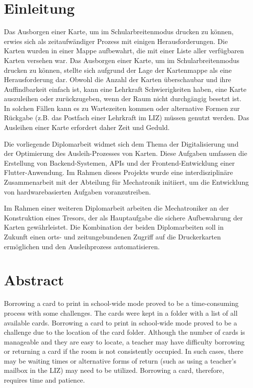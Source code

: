 \section{Einleitung}
Das Ausborgen einer Karte, um im Schularbreitenmodus drucken zu können, erwies sich als zeitaufwändiger Prozess mit einigen Herausforderungen. Die Karten wurden in einer Mappe aufbewahrt, die mit einer Liste aller verfügbaren Karten versehen war. Das Ausborgen einer Karte, um im Schularbreitenmodus drucken zu können, stellte sich aufgrund der Lage der Kartenmappe als eine Herausforderung dar. Obwohl die Anzahl der Karten überschaubar und ihre Auffindbarkeit einfach ist, kann eine Lehrkraft Schwierigkeiten haben, eine Karte auszuleihen oder zurückzugeben, wenn der Raum nicht durchgängig besetzt ist. In solchen Fällen kann es zu Wartezeiten kommen oder alternative Formen zur Rückgabe (z.B. das Postfach einer Lehrkraft im LIZ) müssen genutzt werden. Das Ausleihen einer Karte erfordert daher Zeit und Geduld.\bigskip

\noindent
Die vorliegende Diplomarbeit widmet sich dem Thema der Digitalisierung und der Optimierung des Ausleih-Prozesses von Karten.  Diese Aufgaben umfassen die Erstellung von Backend-Systemen, APIs und der Frontend-Entwicklung einer Flutter-Anwendung. Im Rahmen dieses Projekts wurde eine interdisziplinäre Zusammenarbeit mit der Abteilung für Mechatronik initiiert, um die Entwicklung von hardwarebasierten Aufgaben voranzutreiben. 


Im Rahmen einer weiteren Diplomarbeit arbeiten die Mechatroniker an der Konstruktion
eines Tresors, der als Hauptaufgabe die sichere Aufbewahrung der Karten gewährleistet. Die Kombination der beiden Diplomarbeiten soll in Zukunft einen orts- und zeitungebundenen Zugriff auf die Druckerkarten ermöglichen und den Ausleihprozess automatisieren.





\newpage
\section{Abstract}
Borrowing a card to print in school-wide mode proved to be a time-consuming process with some challenges. The cards were kept in a folder with a list of all available cards. Borrowing a card to print in school-wide mode proved to be a challenge due to the location of the card folder. Although the number of cards is manageable and they are easy to locate, a teacher may have difficulty borrowing or returning a card if the room is not consistently occupied. In such cases, there may be waiting times or alternative forms of return (such as using a teacher's mailbox in the LIZ) may need to be utilized. Borrowing a card, therefore, requires time and patience.\bigskip

